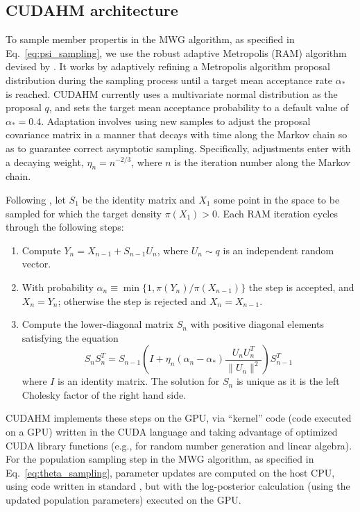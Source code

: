 \subsection{CUDAHM architecture}
\label{sec:arch}

To sample member propertis in the MWG algorithm, as specified in Eq.~\ref{eq:psi_sampling}, we use the robust adaptive Metropolis (RAM) algorithm devised by \cite{vihola2012robust}.
It works by adaptively refining a Metropolis algorithm proposal distribution during the sampling process until a target mean acceptance rate $\alpha_*$ is reached.
CUDAHM currently uses a multivariate normal distribution as the proposal $q$, and sets the target mean acceptance probability to a default value of $\alpha_{*}=0.4$.
Adaptation involves using new samples to adjust the proposal covariance matrix in a manner that decays with time along the Markov chain so as to guarantee correct asymptotic sampling.
Specifically, adjustments enter with a decaying weight, $\eta_{n}=n^{-2/3}$, where $n$ is the iteration number along the Markov chain.

Following \cite{vihola2012robust}, let $S_{1}$ be the identity matrix and $X_{1}$ some point in the space to be sampled for which the target density $\pi(X_{1})>0$.
Each RAM iteration cycles through the following steps: 
\begin{enumerate} \item Compute $Y_{n}=X_{n-1}+S_{n-1}U_{n}$, where $U_{n}\sim q$ is an independent random vector.
\item With probability $\alpha_{n} \equiv \min\{1,\pi(Y_{n})/\pi(X_{n-1})\}$ the step is accepted, and $X_{n}=Y_{n}$; otherwise the step is rejected and $X_{n}=X_{n-1}$.
\item Compute the lower-diagonal matrix $S_{n}$ with positive diagonal elements satisfying the equation
\begin{equation}
S_{n}S_{n}^{T}=S_{n-1}\left(I+\eta_{n}(\alpha_{n}-\alpha_{*})\frac{U_{n}U_{n}^{T}}{\parallel U_{n}\parallel^{2}}\right)S_{n-1}^{T}
\end{equation}
where $I$ is an identity matrix.
The solution for $S_{n}$ is unique as it is the left Cholesky factor of the right hand side.
\end{enumerate}
CUDAHM implements these steps on the GPU, via ``kernel'' code (code executed on a GPU) written in the CUDA language and taking advantage of optimized CUDA library functions (e.g., for random number generation and linear algebra).
For the population sampling step in the MWG algorithm, as specified in Eq.~\ref{eq:theta_sampling}, parameter updates are computed on the host CPU, using code written in standard \Cpp, but with the log-posterior calculation (using the updated population parameters) executed on the GPU.



